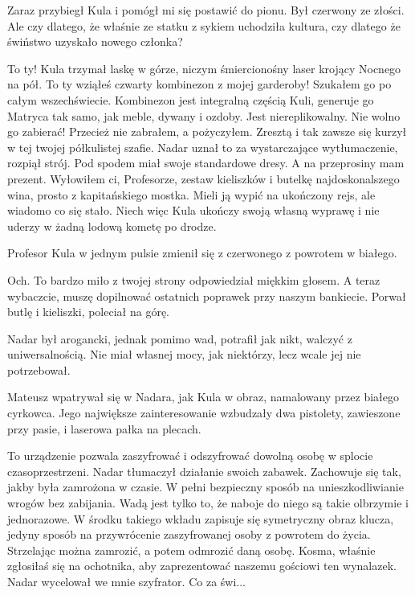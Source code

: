 Zaraz przybiegł Kula i pomógł mi się postawić do pionu. Był czerwony ze złości.
Ale czy dlatego, że właśnie ze statku z sykiem uchodziła kultura, czy dlatego że świństwo uzyskało nowego członka?

\begin{dialogue}
\ds{} To ty! \dm{} Kula trzymał laskę w górze, niczym śmiercionośny laser krojący Nocnego na pół. \dm{} To ty wziąłeś czwarty kombinezon z mojej garderoby! 
Szukałem go po całym wszechświecie. Kombinezon jest integralną częścią Kuli, generuje go Matryca tak samo, jak meble, dywany i ozdoby.
Jest niereplikowalny. Nie wolno go zabierać!
\ds{} Przecież nie zabrałem, a pożyczyłem. Zresztą i tak zawsze się kurzył w tej twojej półkulistej szafie. \dm{}
Nadar uznał to za wystarczające wytłumaczenie, rozpiął strój. Pod spodem miał swoje standardowe dresy. \dm{} 
A na przeprosiny mam prezent. Wyłowiłem ci, Profesorze, zestaw kieliszków i butelkę najdoskonalszego wina, prosto z kapitańskiego mostka.
Mieli ją wypić na ukończony rejs, ale wiadomo co się stało. Niech więc Kula ukończy swoją własną wyprawę i nie uderzy w żadną lodową kometę po drodze. \de{}
\end{dialogue}

Profesor Kula w jednym pulsie zmienił się z czerwonego z powrotem w białego.

\begin{dialogue}
\ds{} Och. To bardzo miło z twojej strony \dm{} odpowiedział miękkim głosem. \dm{} A teraz wybaczcie, muszę dopilnować ostatnich poprawek przy naszym bankiecie. \dm{}
Porwał butlę i kieliszki, poleciał na górę.
\end{dialogue}

Nadar był arogancki, jednak pomimo wad, potrafił jak nikt, walczyć z uniwersalnością.
Nie miał własnej mocy, jak niektórzy, lecz wcale jej nie potrzebował.

Mateusz wpatrywał się w Nadara, jak Kula w obraz, namalowany przez białego cyrkowca.
Jego największe zainteresowanie wzbudzały dwa pistolety, zawieszone przy pasie, i laserowa pałka na plecach.

\begin{dialogue}
\ds{} To urządzenie pozwala zaszyfrować i odszyfrować dowolną osobę w splocie czasoprzestrzeni. \dm{} Nadar tłumaczył działanie swoich zabawek. \dm{}
Zachowuje się tak, jakby była zamrożona w czasie.
W pełni bezpieczny sposób na unieszkodliwianie wrogów bez zabijania.
Wadą jest tylko to, że naboje do niego są takie olbrzymie i jednorazowe.
W środku takiego wkładu zapisuje się symetryczny obraz klucza, jedyny sposób na przywrócenie zaszyfrowanej osoby z powrotem do życia.
Strzelając można zamrozić, a potem odmrozić daną osobę.
Kosma, właśnie zgłosiłaś się na ochotnika, aby zaprezentować naszemu gościowi ten wynalazek. \dm{} Nadar wycelował we mnie szyfrator. Co za świ...
\end{dialogue}

